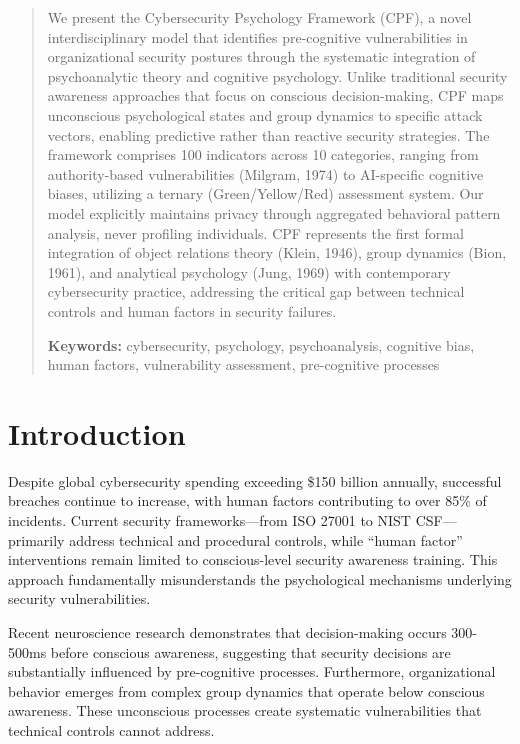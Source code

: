 \documentclass[11pt,a4paper]{article}
\begin{document}
\begin{abstract}
\noindent
We present the Cybersecurity Psychology Framework (CPF), a novel interdisciplinary model that identifies pre-cognitive vulnerabilities in organizational security postures through the systematic integration of psychoanalytic theory and cognitive psychology. Unlike traditional security awareness approaches that focus on conscious decision-making, CPF maps unconscious psychological states and group dynamics to specific attack vectors, enabling predictive rather than reactive security strategies. The framework comprises 100 indicators across 10 categories, ranging from authority-based vulnerabilities (Milgram, 1974) to AI-specific cognitive biases, utilizing a ternary (Green/Yellow/Red) assessment system. Our model explicitly maintains privacy through aggregated behavioral pattern analysis, never profiling individuals. CPF represents the first formal integration of object relations theory (Klein, 1946), group dynamics (Bion, 1961), and analytical psychology (Jung, 1969) with contemporary cybersecurity practice, addressing the critical gap between technical controls and human factors in security failures.

\vspace{0.5em}
\noindent\textbf{Keywords:} cybersecurity, psychology, psychoanalysis, cognitive bias, human factors, vulnerability assessment, pre-cognitive processes
\end{abstract}

\vspace{1cm}

\section{Introduction}
Despite global cybersecurity spending exceeding \$150 billion annually\cite{gartner2023}, successful breaches continue to increase, with human factors contributing to over 85\% of incidents\cite{verizon2023}. Current security frameworks---from ISO 27001 to NIST CSF---primarily address technical and procedural controls, while ``human factor'' interventions remain limited to conscious-level security awareness training\cite{sans2023}. This approach fundamentally misunderstands the psychological mechanisms underlying security vulnerabilities.

Recent neuroscience research demonstrates that decision-making occurs 300-500ms before conscious awareness\cite{libet1983, soon2008}, suggesting that security decisions are substantially influenced by pre-cognitive processes. Furthermore, organizational behavior emerges from complex group dynamics that operate below conscious awareness\cite{bion1961, kernberg1998}. These unconscious processes create systematic vulnerabilities that technical controls cannot address.
\end{document}
